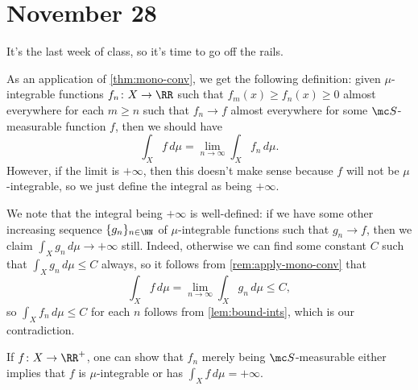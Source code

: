 \documentclass[../notes.tex]{subfiles}
\begin{document}
\section{November 28}

It's the last week of class, so it's time to go off the rails.
\begin{remark}
	As an application of \autoref{thm:mono-conv}, we get the following definition: given $\mu$-integrable functions $f_n\colon X\to\RR$ such that $f_m(x)\ge f_n(x)\ge0$ almost everywhere for each $m\ge n$ such that $f_n\to f$ almost everywhere for some $\mc S$-measurable function $f$, then we should have
	\[\int_Xf\,d\mu=\lim_{n\to\infty}\int_Xf_n\,d\mu.\]
	However, if the limit is $+\infty$, then this doesn't make sense because $f$ will not be $\mu$-integrable, so we just define the integral as being $+\infty$.
\end{remark}
\begin{remark}
	We note that the integral being $+\infty$ is well-defined: if we have some other increasing sequence $\{g_n\}_{n\in\NN}$ of $\mu$-integrable functions such that $g_n\to f$, then we claim $\int_Xg_n\,d\mu\to+\infty$ still. Indeed, otherwise we can find some constant $C$ such that $\int_Xg_n\,d\mu\le C$ always, so it follows from \autoref{rem:apply-mono-conv} that
	\[\int_Xf\,d\mu=\lim_{n\to\infty}\int_Xg_n\,d\mu\le C,\]
	so $\int_Xf_n\,d\mu\le C$ for each $n$ follows from \autoref{lem:bound-ints}, which is our contradiction.
\end{remark}
\begin{remark}
	If $f\colon X\to\RR^+$, one can show that $f_n$ merely being $\mc S$-measurable either implies that $f$ is $\mu$-integrable or has $\int_Xf\,d\mu=+\infty$.
\end{remark}
\end{document}
